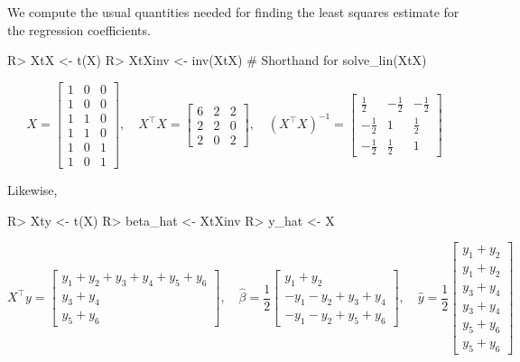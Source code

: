 We compute the usual quantities needed for finding the least squares
estimate for the regression coefficients.

\begin{Schunk}
\begin{Sinput}
R> XtX <- t(X) %
R> XtXinv <- inv(XtX) # Shorthand for solve_lin(XtX)
\end{Sinput}
\end{Schunk}

\[
  X = \left[\begin{matrix}1 & 0 & 0\\1 & 0 & 0\\1 & 1 & 0\\1 & 1 & 0\\1 & 0 & 1\\1 & 0 & 1\end{matrix}\right], \quad
  X^\top X = \left[\begin{matrix}6 & 2 & 2\\2 & 2 & 0\\2 & 0 & 2\end{matrix}\right], \quad
  (X^\top X)^{-1} = \left[\begin{matrix}\frac{1}{2} & - \frac{1}{2} & - \frac{1}{2}\\- \frac{1}{2} & 1 & \frac{1}{2}\\- \frac{1}{2} & \frac{1}{2} & 1\end{matrix}\right] 
\]

Likewise,

\begin{Schunk}
\begin{Sinput}
R> Xty <- t(X) %
R> beta_hat <- XtXinv %
R> y_hat <- X %
\end{Sinput}
\end{Schunk}

\[
  X^\top y = \left[\begin{matrix}y_{1} + y_{2} + y_{3} + y_{4} + y_{5} + y_{6}\\y_{3} + y_{4}\\y_{5} + y_{6}\end{matrix}\right], \quad
  \hat{\beta} = \frac 1 2 \left[\begin{matrix}y_{1} + y_{2}\\- y_{1} - y_{2} + y_{3} + y_{4}\\- y_{1} - y_{2} + y_{5} + y_{6}\end{matrix}\right], \quad 
  \hat{y} = \frac 1 2 \left[\begin{matrix}y_{1} + y_{2}\\y_{1} + y_{2}\\y_{3} + y_{4}\\y_{3} + y_{4}\\y_{5} + y_{6}\\y_{5} + y_{6}\end{matrix}\right]
\]

